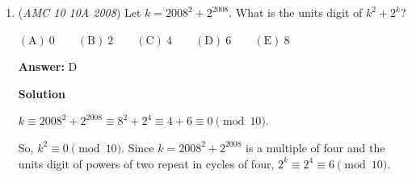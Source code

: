 \begin{enumerate}
 $10+30=40 \implies \boxed{\textbf{(B) 40}}$




\textbf{Solution 3}

We label the subsets subset 1 and subset 2. Suppose the first subset has $k$ elements where $k<5.$ The second element has $5-k$ elements which the first subset does not contain (in order for the union to be the whole set). Additionally, the second set has 2 elements in common with the first subset. Therefore the number of ways to choose these sets is $\binom{5}{k} \cdot \binom{k}{2}.$ Computing for $k<5$ we have $10+30+30+10=80.$ Divide by 2 as order does not matter to get $40.$




\textbf{Solution 4 (Stars And Bars) [Isn't actually a valid solution]}

There are $\dbinom{5}{2}=10$ ways to choose the 2 shared elements. We now must place the 3 remaining elements into the subsets. Using stars and bars, we can notate this as: $I I I X \rightarrow \dbinom{4}{3}=4$. Thus, $4*10=\boxed{\textbf{(B) 40}}$

 Note from harryhero:

 This actually doesn't work for higher cases. In the 6-case, for example, we obtain an incorrect answer of $50$ using this method when it should be $80.$ This occurs due to the lack of order for the three elements - for example, having a, b on one side and d on another is different from b, c on one side and e on another, but we've counted both cases equally in the stars-and-bars method.

 Note from MaxIsW: This solution doesn't work for most cases and got lucky with the right numbers in this case.

 Note: the problem where this is linked is covered 0:20-1:10

 


	\item (\textit{AMC 10 10A 2008}) Let $k={2008}^{2}+{2}^{2008}$. What is the units digit of $k^2+2^k$?


 $\mathrm{(A)}\ 0\qquad\mathrm{(B)}\ 2\qquad\mathrm{(C)}\ 4\qquad\mathrm{(D)}\ 6\qquad\mathrm{(E)}\ 8$

 \textbf{Answer: }D



\textbf{Solution}

$k \equiv 2008^2 + 2^{2008} \equiv 8^2 + 2^4 \equiv 4+6 \equiv 0 \pmod{10}$. 

 So, $k^2 \equiv 0 \pmod{10}$. Since $k = 2008^2+2^{2008}$   is a multiple of four and the units digit of powers of two repeat in cycles of four, $2^k \equiv 2^4 \equiv 6 \pmod{10}$. 


\end{enumerate}
